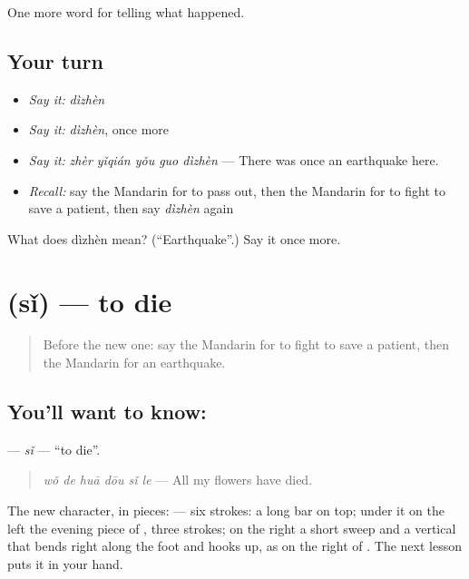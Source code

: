 \begin{grammarlens}[title={What you've built}]
One more word for telling what happened.
\end{grammarlens}

\subsection*{Your turn}
\begin{itemize}
\raggedright
  \item \emph{Say it:} \emph{dìzhèn}
  \item \emph{Say it:} \emph{dìzhèn}, once more
  \item \emph{Say it:} \emph{zhèr yǐqián yǒu guo dìzhèn} — There was once an earthquake here.
  \item \emph{Recall:} say the Mandarin for to pass out, then the Mandarin for to fight to save a patient, then say \emph{dìzhèn} again
\end{itemize}

\begin{tcolorbox}[breakable,colback=teal!4,colframe=teal!35!black,title={Before you move on}]
What does dìzhèn mean? (\textquotedblleft{}Earthquake\textquotedblright{}.) Say it once more.
\end{tcolorbox}
\section[\texorpdfstring{\zh{死} (sǐ)}{死 (sǐ)}]{ (sǐ) — to die}

\label{lesson:ZH-C300-si}



\begin{quote}
Before the new one: say the Mandarin for to fight to save a patient, then the Mandarin for an earthquake.
\end{quote}

\subsection*{You'll want to know: }
\textbf{} — \emph{sǐ} — \textquotedblleft{}to die\textquotedblright{}.

\begin{quote}
\textbf{} \emph{wǒ de huā dōu sǐ le} — All my flowers have died.
\end{quote}

The new character, in pieces:  — six strokes: a long bar on top; under it on the left the evening piece of , three strokes; on the right a short sweep and a vertical that bends right along the foot and hooks up, as on the right of . The next lesson puts it in your hand.

